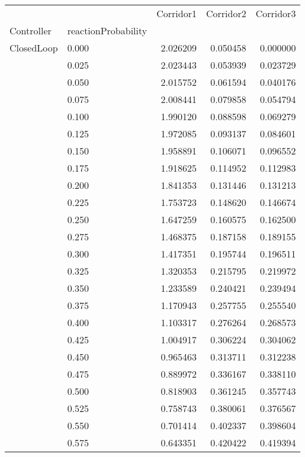 \begin{tabular}{llrrr}
\toprule
         &       &  Corridor1 &  Corridor2 &  Corridor3 \\
Controller & reactionProbability &            &            &            \\
\midrule
ClosedLoop & 0.000 &   2.026209 &   0.050458 &   0.000000 \\
         & 0.025 &   2.023443 &   0.053939 &   0.023729 \\
         & 0.050 &   2.015752 &   0.061594 &   0.040176 \\
         & 0.075 &   2.008441 &   0.079858 &   0.054794 \\
         & 0.100 &   1.990120 &   0.088598 &   0.069279 \\
         & 0.125 &   1.972085 &   0.093137 &   0.084601 \\
         & 0.150 &   1.958891 &   0.106071 &   0.096552 \\
         & 0.175 &   1.918625 &   0.114952 &   0.112983 \\
         & 0.200 &   1.841353 &   0.131446 &   0.131213 \\
         & 0.225 &   1.753723 &   0.148620 &   0.146674 \\
         & 0.250 &   1.647259 &   0.160575 &   0.162500 \\
         & 0.275 &   1.468375 &   0.187158 &   0.189155 \\
         & 0.300 &   1.417351 &   0.195744 &   0.196511 \\
         & 0.325 &   1.320353 &   0.215795 &   0.219972 \\
         & 0.350 &   1.233589 &   0.240421 &   0.239494 \\
         & 0.375 &   1.170943 &   0.257755 &   0.255540 \\
         & 0.400 &   1.103317 &   0.276264 &   0.268573 \\
         & 0.425 &   1.004917 &   0.306224 &   0.304062 \\
         & 0.450 &   0.965463 &   0.313711 &   0.312238 \\
         & 0.475 &   0.889972 &   0.336167 &   0.338110 \\
         & 0.500 &   0.818903 &   0.361245 &   0.357743 \\
         & 0.525 &   0.758743 &   0.380061 &   0.376567 \\
         & 0.550 &   0.701414 &   0.402337 &   0.398604 \\
         & 0.575 &   0.643351 &   0.420422 &   0.419394 \\

\end{tabular}
